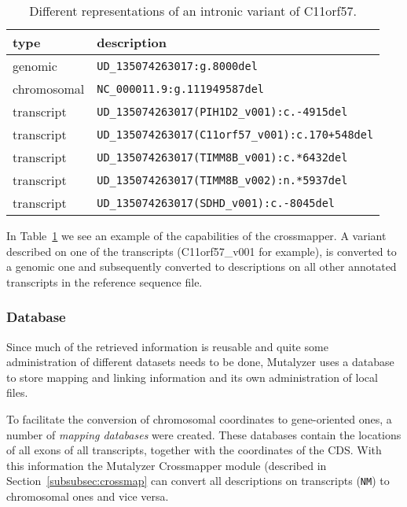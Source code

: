 \documentclass{article}
\begin{document}
\begin{table}[]
  \caption{Different representations of an intronic variant of C11orf57.}
  \label{tab:crossmap}
  \begin{center}
    \begin{tabular}{l|l}
      type & description\\
      \hline
      genomic     & \texttt{UD\_135074263017:g.8000del}\\
      chromosomal & \texttt{NC\_000011.9:g.111949587del}\\
      transcript  & \texttt{UD\_135074263017(PIH1D2\_v001):c.-4915del}\\
      transcript  & \texttt{UD\_135074263017(C11orf57\_v001):c.170+548del}\\
      transcript  & \texttt{UD\_135074263017(TIMM8B\_v001):c.*6432del}\\
      transcript  & \texttt{UD\_135074263017(TIMM8B\_v002):n.*5937del}\\
      transcript  & \texttt{UD\_135074263017(SDHD\_v001):c.-8045del}\\
    \end{tabular}
  \end{center}
\end{table}

In Table~\ref{tab:crossmap} we see an example of the capabilities of the
cross\-mapper. A variant described on one of the transcripts (C11orf57\_v001
for example), is converted to a genomic one and subsequently converted to
descriptions on all other annotated transcripts in the reference sequence file.

\subsubsection{Database} \label{subsubsec:db}
Since much of the retrieved information is reusable and quite some
administration of different datasets needs to be done, Mutalyzer uses a
database to store mapping and linking information and its own administration
of local files.

To facilitate the conversion of chromosomal coordinates to gene-oriented ones,
a number of \emph{mapping databases} were created. These databases contain the
locations of all exons of all transcripts, together with the coordinates of the
CDS. With this information the Mutalyzer Crossmapper module (described in
Section~\ref{subsubsec:crossmap} can convert all descriptions on transcripts
(\texttt{NM}) to chromosomal ones and vice versa.
\end{document}

